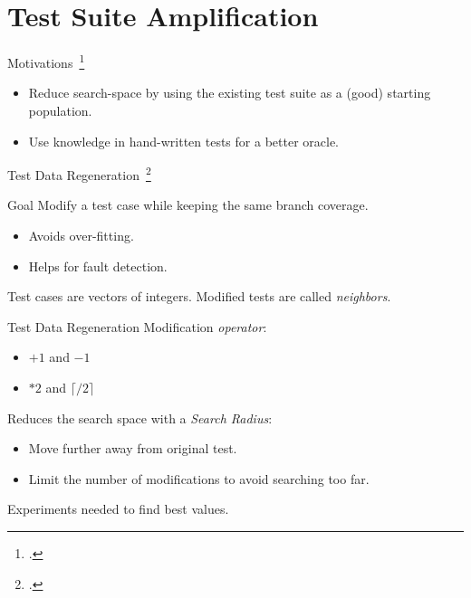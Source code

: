 \documentclass{beamer}
\begin{document}
\section{Test Suite Amplification}

\begin{frame}{Motivations~\footcite{danglot2017emerging}}
  \begin{itemize}
    \item Reduce search-space by using the existing test suite as a (good) starting population.
    \item Use knowledge in hand-written tests for a better oracle.
  \end{itemize}
\end{frame}

\begin{frame}{Test Data Regeneration~\footcite{yoo2012test}}
  \begin{block}{Goal}
    Modify a test case while keeping the same branch coverage.
    \begin{itemize}
      \item Avoids over-fitting.
      \item Helps for fault detection.
    \end{itemize}
  \end{block}

  \vfill

  Test cases are vectors of integers.
  Modified tests are called \emph{neighbors}.
\end{frame}

\begin{frame}{Test Data Regeneration}
  Modification \emph{operator}:
  \begin{itemize}
    \item $+ 1$ and $- 1$
    \item $* 2$ and $\lceil / 2\rceil$
  \end{itemize}

  \pause{}

  Reduces the search space with a \emph{Search Radius}:
  \begin{itemize}
    \item Move further away from original test.
    \item Limit the number of modifications to avoid searching too far.
  \end{itemize}

  \vfill

  Experiments needed to find best values.
\end{frame}
\end{document}
